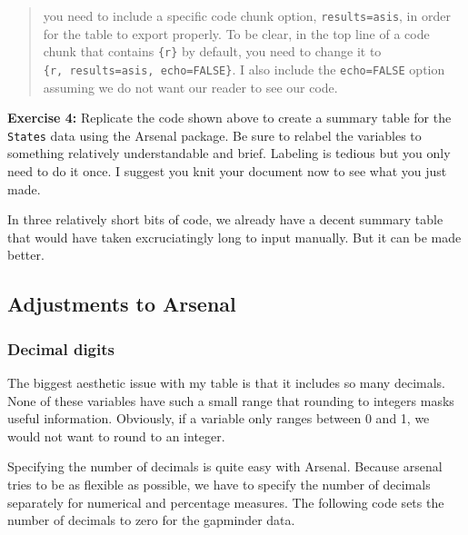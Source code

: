 \documentclass[
]{book}
\newenvironment{rmdblock}[1]
  {\begin{shaded*}
  }
  {\end{shaded*}
  }
\newenvironment{learncheck}
  {\begin{rmdblock}{warning}}
  {\end{rmdblock}}
\begin{document}
\begin{quote}
you need to include a specific code chunk option, \texttt{results=\textquotesingle{}asis\textquotesingle{}}, in order for the table to export properly. To be clear, in the top line of a code chunk that contains \texttt{\{r\}} by default, you need to change it to \texttt{\{r,\ results=\textquotesingle{}asis\textquotesingle{},\ echo=FALSE\}}. I also include the \texttt{echo=FALSE} option assuming we do not want our reader to see our code.
\end{quote}

\begin{learncheck}
\textbf{Exercise 4:} Replicate the code shown above to create a summary
table for the \texttt{States} data using the Arsenal package. Be sure to
relabel the variables to something relatively understandable and brief.
Labeling is tedious but you only need to do it once. I suggest you knit
your document now to see what you just made.
\end{learncheck}

In three relatively short bits of code, we already have a decent summary table that would have taken excruciatingly long to input manually. But it can be made better.

\hypertarget{adjustments-to-arsenal}{%
\subsection{Adjustments to Arsenal}\label{adjustments-to-arsenal}}

\hypertarget{decimal-digits}{%
\subsubsection{Decimal digits}\label{decimal-digits}}

The biggest aesthetic issue with my table is that it includes so many decimals. None of these variables have such a small range that rounding to integers masks useful information. Obviously, if a variable only ranges between 0 and 1, we would not want to round to an integer.

Specifying the number of decimals is quite easy with Arsenal. Because arsenal tries to be as flexible as possible, we have to specify the number of decimals separately for numerical and percentage measures. The following code sets the number of decimals to zero for the gapminder data.
\end{document}
